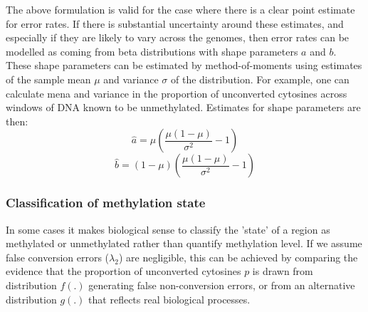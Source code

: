 \documentclass[12pt,longbibliography]{article}
\begin{document}
The above formulation is valid for the case where there is a clear point estimate for error rates.
If there is substantial uncertainty around these estimates, and especially if they are likely to vary across the genomes, then error rates can be modelled as coming from beta distributions with shape parameters $a$ and $b$.
These shape parameters can be estimated by method-of-moments using estimates of the sample mean $\mu$ and variance $\sigma$ of the distribution.
For example, one can calculate mena and variance in the proportion of unconverted cytosines across windows of DNA known to be unmethylated.
Estimates for shape parameters are then:
\begin{equation}
    \hat{a} = \mu(\frac{\mu(1-\mu)}{\sigma^2}-1)
    \label{eqn:beta-a}
\end{equation}
\begin{equation}
    \hat{b} = (1-\mu)(\frac{\mu(1-\mu)}{\sigma^2}-1) 
    \label{eqn:beta-b}
\end{equation}

\subsubsection{Classification of methylation state} \label{sec:meth-state}

In some cases it makes biological sense to classify the 'state' of a region as methylated or unmethylated rather than quantify methylation level.
If we assume false conversion errors ($\lambda_2$) are negligible, this can be achieved by comparing the evidence that the proportion of unconverted cytosines $p$ is drawn from distribution $f(.)$ generating false non-conversion errors, or from an alternative distribution $g(.)$ that reflects real biological processes.
\end{document}
